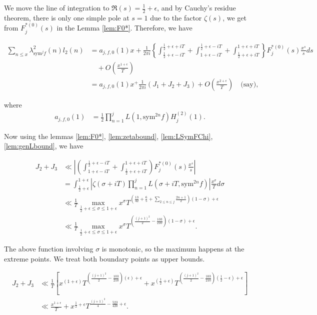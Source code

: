 \documentclass[10pt]{amsart}
\begin{document}
We move the line of integration to $\Re(s)=\frac{1}{2}+\epsilon$, and by Cauchy's residue theorem, there is only one simple pole at $s=1$ due to the factor $\zeta(s)$, we get from $F^{*(0)}_{j}(s)$ in the Lemma \ref{lem:F0*}. Therefore, we have

\begin{align}
    \sum_{n\leq x}\lambda_{\mathrm{sym}^{j}f}^2(n)l_2(n) & = a_{j,f,0}(1)x+\frac{1}{2\pi i}\left\{\int_{\frac{1}{2}+\epsilon-iT}^{\frac{1}{2}+\epsilon+iT}+\int_{1+\epsilon-iT}^{\frac{1}{2}+\epsilon-iT}+\int_{\frac{1}{2}+\epsilon+iT}^{1+\epsilon+iT}\right\}F_{j}^{*(0)}(s)\frac{x^{s}}{s}ds \\
    &\quad + O\left(\frac{x^{1+\epsilon}}{T}\right) \\
    &= a_{j,f,0}(1)x^+\frac{1}{2\pi i}(J_{1}+J_{2}+J_{3})+O\left(\frac{x^{2+\epsilon}}{T}\right) \quad \text{(say)} ,
\end{align}

where \begin{align} \label{ajf0}
    a_{j,f,0}(1) &= \frac{1}{2}\prod_{n=1}^{j}L(1,\mathrm{sym}^{2n}f)H_j^{(2)}(1).
\end{align}

Now using the lemmas \ref{lem:F0*}, \ref{lem:zetabound}, \ref{lem:LSymFChi}, \ref{lem:genLbound}, we have

\begin{align}
    J_2+J_3 &\ll \left| \left( \int_{1+\epsilon-iT}^{\frac{1}{2}+\epsilon-iT}+\int_{\frac{1}{2}+\epsilon+iT}^{1+\epsilon+iT} \right)F_j^{*(0)}(s)\frac{x^s}{s}\right| \\
    &= \int_{\frac{1}{2}+\epsilon}^{1+\epsilon} \left|\zeta(\sigma+iT)\prod_{n=1}^{j}L(\sigma +iT, \mathrm{sym}^{2n} f)\right|\frac{x^{\sigma}}{T}d\sigma \\
    &\ll \frac{1}{T}\max_{\frac{1}{2}+\epsilon \leq \sigma \leq 1+\epsilon} x^\sigma T^{(\frac{13}{42}+\frac{6}{5}+\sum_{2\leq n\leq j}\frac{2n+1}{2})(1-\sigma)+\epsilon}\\
    &\ll \frac{1}{T}\max_{\frac{1}{2}+\epsilon \leq \sigma \leq 1+\epsilon}x^\sigma T^{(\frac{(j+1)^2}{2}-\frac{103}{210})(1-\sigma)+\epsilon}.
\end{align}

The above function involving $\sigma$ is monotonic, so the maximum happens at the extreme points. We treat both boundary points as upper bounds.

\begin{align*}
    J_2+J_3 &\ll \frac{1}{T}\left[ x^{(1+\epsilon)} T^{(\frac{(j+1)^2}{2}-\frac{103}{210})(\epsilon)+\epsilon} +x^{(\frac{1}{2}+\epsilon)} T^{(\frac{(j+1)^2}{2}-\frac{103}{210})(\frac{1}{2}-\epsilon)+\epsilon}\right] \\
    &\ll \frac{x^{1+\epsilon}}{T} + x^{\frac{1}{2}+\epsilon}T^{\frac{(j+1)^2}{4}-\frac{523}{420}+\epsilon} .
\end{align*}
\end{document}
